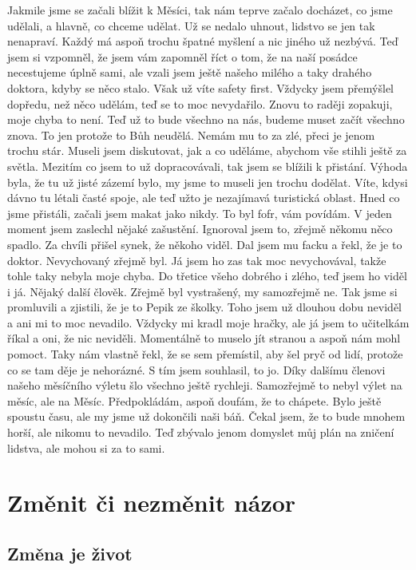 Jakmile jsme se začali blížit k Měsíci, tak nám teprve začalo docházet, co jsme udělali, a hlavně, co chceme udělat. Už se nedalo uhnout, lidstvo se jen tak nenapraví. Každý má aspoň trochu špatné myšlení a nic jiného už nezbývá. Teď jsem si vzpomněl, že jsem vám zapomněl říct o tom, že na naší posádce necestujeme úplně sami, ale vzali jsem ještě našeho milého a taky drahého doktora, kdyby se něco stalo. Však už víte safety first. Vždycky jsem přemýšlel dopředu, než něco udělám, teď se to moc nevydařilo. Znovu to raději zopakuji, moje chyba to není. Teď už to bude všechno na nás, budeme muset začít všechno znova. To jen protože to Bůh neudělá. Nemám mu to za zlé, přeci je jenom trochu stár. Museli jsem diskutovat, jak a co uděláme, abychom vše stihli ještě za světla. Mezitím co jsem to už dopracovávali, tak jsem se blížili k přistání. Výhoda byla, že tu už jisté zázemí bylo, my jsme to museli jen trochu dodělat. Víte, kdysi dávno tu létali časté spoje, ale teď užto je nezajímavá turistická oblast. Hned co jsme přistáli, začali jsem makat jako nikdy. To byl fofr, vám povídám. V jeden moment jsem zaslechl nějaké zašustění. Ignoroval jsem to, zřejmě někomu něco spadlo. Za chvíli přišel synek, že někoho viděl. Dal jsem mu facku a řekl, že je to doktor. Nevychovaný zřejmě byl. Já jsem ho zas tak moc nevychovával, takže tohle taky nebyla moje chyba. Do třetice všeho dobrého i zlého, teď jsem ho viděl i já. Nějaký další člověk. Zřejmě byl vystrašený, my samozřejmě ne. Tak jsme si promluvili a zjistili, že je to Pepik ze školky. Toho jsem už dlouhou dobu neviděl a ani mi to moc nevadilo. Vždycky mi kradl moje hračky, ale já jsem to učitelkám říkal a oni, že nic neviděli. Momentálně to muselo jít stranou a aspoň nám mohl pomoct. Taky nám vlastně řekl, že se sem přemístil, aby šel pryč od lidí, protože co se tam děje je nehorázné. S tím jsem souhlasil, to jo. Díky dalšímu členovi našeho měsíčního výletu šlo všechno ještě rychleji. Samozřejmě to nebyl výlet na měsíc, ale na Měsíc. Předpokládám, aspoň doufám, že to chápete. Bylo ještě spoustu času, ale my jsme už dokončili naši báň. Čekal jsem, že to bude mnohem horší, ale nikomu to nevadilo. Teď zbývalo jenom domyslet můj plán na zničení lidstva, ale mohou si za to sami.

\chapter{Změnit či nezměnit názor}

\section{Změna je život}

